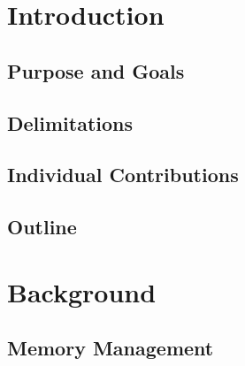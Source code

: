 \documentclass[a4paper,12pt]{article}
\begin{document}

\cleardoublepage

\mainmatter


\section{Introduction}
\label{sec:introduction}


\newpage
\subsection{Purpose and Goals}
\label{sec:purpose}


\vspace{-0.4cm}
\subsection{Delimitations}
\label{sec:delimitations}


\subsection{Individual Contributions}
\label{sec:individual_contrubitons}


\subsection{Outline}
\label{sec:outline}


% 

\newpage
\section{Background}
\label{sec:background}


\subsection{Memory Management}
\label{sec:memory_management}

\end{document}
